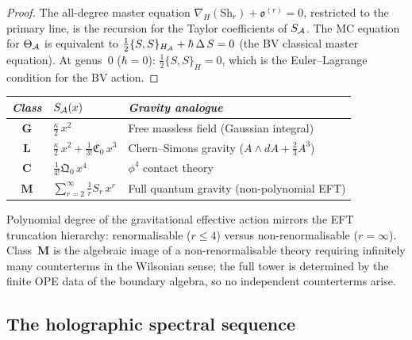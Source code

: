 \begin{proof}
The all-degree master equation
$\nabla_H(\mathrm{Sh}_r) + \mathfrak{o}^{(r)} = 0$,
restricted to the primary line, is the recursion for the
Taylor coefficients of $S_{\mathcal{A}}$. The MC equation for
$\Theta_{\mathcal{A}}$ is equivalent to
$\frac{1}{2}\{S, S\}_{H_{\mathcal{A}}} + \hbar\,\Delta\,S = 0$
(the BV classical master equation). At genus~$0$ ($\hbar = 0$):
$\frac{1}{2}\{S, S\}_H = 0$, which is the Euler--Lagrange
condition for the BV action.
\end{proof}

\begin{remark}
\begin{center}
\small
\renewcommand{\arraystretch}{1.25}
\begin{tabular}{cll}
\toprule
\emph{Class} & $S_{\mathcal{A}}(x)$ &
\emph{Gravity analogue} \\
\midrule
$\mathbf{G}$ &
 $\frac{\kappa}{2}\,x^2$ &
 Free massless field (Gaussian integral) \\
$\mathbf{L}$ &
 $\frac{\kappa}{2}\,x^2 + \frac{1}{3!}\mathfrak{C}_0\,x^3$ &
 Chern--Simons gravity ($A\wedge dA + \frac{2}{3}A^3$) \\
$\mathbf{C}$ &
 $\frac{1}{4!}\mathfrak{Q}_0\,x^4$ &
 $\phi^4$ contact theory \\
$\mathbf{M}$ &
 $\sum_{r=2}^\infty \frac{1}{r}S_r\,x^r$ &
 Full quantum gravity (non-polynomial EFT) \\
\bottomrule
\end{tabular}
\end{center}
Polynomial degree of the gravitational effective action
mirrors the EFT truncation hierarchy: renormalisable ($r \leq 4$)
versus non-renormalisable ($r = \infty$). Class~$\mathbf{M}$ is
the algebraic image of a non-renormalisable theory requiring
infinitely many counterterms in the Wilsonian sense; the full
tower is determined by the finite OPE data of the boundary
algebra, so no independent counterterms arise.
\end{remark}



\subsection{The holographic spectral sequence}

